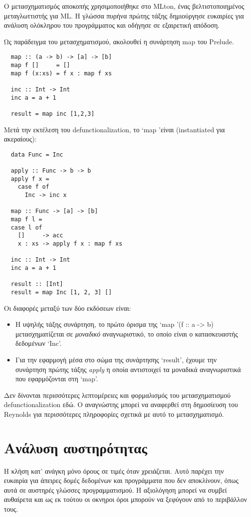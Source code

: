 \documentclass[diploma]{softlab-thesis}
\begin{document}
Ο μετασχηματισμός αποκοπής χρησιμοποιήθηκε στο MLton, ένας βελτιστοποιημένος μεταγλωττιστής για ML. 
Η γλώσσα πυρήνα πρώτης τάξης δημιούργησε ευκαιρίες για ανάλυση ολόκληρου του προγράμματος και 
οδήγησε σε εξαιρετική απόδοση.

Ως παράδειγμα του μετασχηματισμού, ακολουθεί η συνάρτηση map του Prelude.

\begin{verbatim}
  map :: (a -> b) -> [a] -> [b]
  map f []     = []
  map f (x:xs) = f x : map f xs

  inc :: Int -> Int 
  inc a = a + 1
  
  result = map inc [1,2,3]
\end{verbatim}

Μετά την εκτέλεση του defunctionalization, το `map 'είναι (instantiated για ακεραίους):
\begin{verbatim}
  data Func = Inc 

  apply :: Func -> b -> b
  apply f x =
    case f of
      Inc -> inc x

  map :: Func -> [a] -> [b]
  map f l =
  case l of
    []     -> acc
    x : xs -> apply f x : map f xs

  inc :: Int -> Int 
  inc a = a + 1

  result :: [Int]
  result = map Inc [1, 2, 3] []
\end{verbatim}

Οι διαφορές μεταξύ των δύο εκδόσεων είναι:
\begin{itemize}
\item Η υψηλής τάξης συνάρτηση, το πρώτο όρισμα της `map '(f :: a -> b)
μετασχηματίζεται σε \textit{μοναδικό} αναγνωριστικό, το οποίο είναι ο κατασκευαστής δεδομένων `Inc'.
\item Για την εφαρμογή μέσα στο σώμα της συνάρτησης `result', έχουμε την συνάρτηση πρώτης τάξης 
\textit{apply} η οποία αντιστοιχεί τα μοναδικά αναγνωριστικά που εφαρμόζονται στη `map'.
\end{itemize}

Δεν δίνονται περισσότερες λεπτομέρειες και φορμαλισμός του μετασχηματισμού defunctionalization εδώ.
Ο αναγνώστης μπορεί να αναφερθεί στη δημοσίευση του Reynolds για περισσότερες πληροφορίες 
σχετικά με αυτό το μετασχηματισμό.

\section{Ανάλυση αυστηρότητας}

Η κλήση κατ' ανάγκη μόνο όρους σε τιμές όταν χρειάζεται. Αυτό παρέχει την
ευκαιρία για άπειρες δομές δεδομένων και προγράμματα που δεν αποκλίνουν, όπως αυτά σε
αυστηρές γλώσσες προγραμματισμού. H αξιολόγηση μπορεί να συμβεί
αυθαίρετα και ως εκ τούτου οι οκνηροι όροι μπορούν να ξεφύγουν από το περιβάλλον τους.
\end{document}
